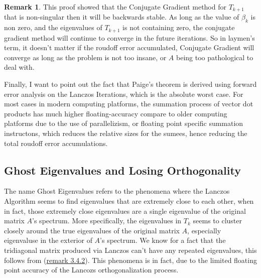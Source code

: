 \documentclass[]{article}
\theoremstyle{definition}
\newtheorem{remark}{Remark}[subsection]
\begin{document}
            \begin{remark}
                This proof showed that the Conjugate Gradient method for $T_{k + 1}$ that is non-singular then it will be backwards stable. As long as the value of $\beta_k$ is non zero, and the eigenvalues of $T_{k + 1}$ is not containing zero, the conjugate gradient method will continue to converge in the future iterations. So in laymen's term, it doesn't matter if the roudoff error accumulated, Conjugate Gradient will converge as long as the problem is not too insane, or $A$ being too pathological to deal with. 
                \par
                Finally, I want to point out the fact that Paige's theorem is derived using forward error analysis on the Lanczos Iterations, which is the absolute worst case. For most cases in modern computing platforms, the summation process of vector dot products has much higher floating-accuracy compare to older computing platforms due to the use of parallelizism, or floating point specific summation instructons, which reduces the relative sizes for the sumees, hence reducing the total roudoff error accumulations. 
            \end{remark}

    \subsection{Ghost Eigenvalues and Losing Orthogonality}
        The name Ghost Eigenvalues refers to the phenomena where the Lanczos Algorithm seems to find eigenvalues that are extremely close to each other, when in fact, those extremely close eigenvalues are a single eigenvalue of the original matrix $A$'s spectrum. More specifically, the eigenvalues in $T_k$ seems to cluster closely around the true eigenvalues of the original matrix $A$, especially eigenvaluse in the exterior of $A$'s spectrum. We know for a fact that the tridiagonal matrix produced via Lanczos can't have any repeated eigenvalues, this follows from (\hyperref[remark:Minimal_Polynomial_from_Lanczos_Iterations]{remark 3.4.2}). This phenomena is in fact, due to the limited floating point accuracy of the Lancozs orthogonalization process.
\end{document}
